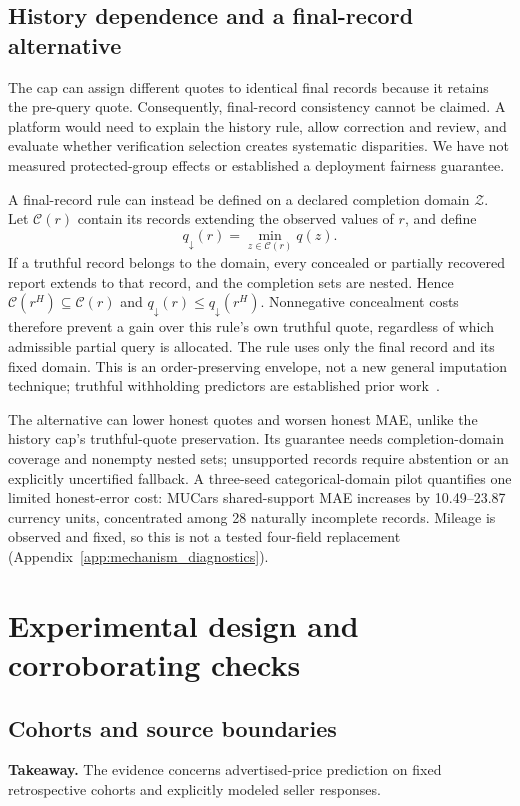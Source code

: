 \documentclass[11pt]{article}
\begin{document}
\subsection{History dependence and a final-record alternative}
The cap can assign different quotes to identical final records because it
retains the pre-query quote. Consequently, final-record consistency cannot
be claimed. A platform would need to explain the history rule, allow correction
and review, and evaluate whether verification selection creates systematic
disparities. We have not measured protected-group effects or established a
deployment fairness guarantee.

A final-record rule can instead be defined on a declared completion domain
$\mathcal Z$. Let $\mathcal C(r)$ contain its records extending the observed
values of $r$, and define
\[
 q_{\downarrow}(r)=\min_{z\in\mathcal C(r)}q(z).
\]
If a truthful record belongs to the domain, every concealed or partially
recovered report extends to that record, and the completion sets are nested.
Hence $\mathcal C(r^H)\subseteq\mathcal C(r)$ and
$q_{\downarrow}(r)\le q_{\downarrow}(r^H)$. Nonnegative concealment costs
therefore prevent a gain over this rule's own truthful quote, regardless of
which admissible partial query is allocated. The rule uses only the final
record and its fixed domain. This is an order-preserving envelope, not a new
general imputation technique; truthful withholding predictors are established
prior work~\cite{withheld,smi}.

The alternative can lower honest quotes and worsen honest MAE, unlike the
history cap's truthful-quote preservation. Its guarantee needs completion-domain
coverage and nonempty nested sets; unsupported records require abstention or
an explicitly uncertified fallback. A three-seed categorical-domain pilot
quantifies one limited honest-error cost: MUCars shared-support MAE increases
by 10.49--23.87 currency units, concentrated among 28 naturally incomplete
records. Mileage is observed and fixed, so this is not a tested four-field
replacement (Appendix~\ref{app:mechanism_diagnostics}).

\section{Experimental design and corroborating checks}\label{sec:experiment_setup}
\subsection{Cohorts and source boundaries}
\noindent\textbf{Takeaway.} The evidence concerns advertised-price prediction
on fixed retrospective cohorts and explicitly modeled seller responses.
\end{document}
